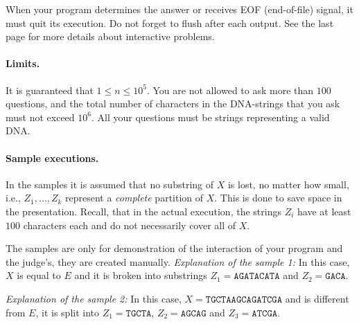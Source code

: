 When your program determines the answer or receives EOF (end-of-file) signal, it must quit its execution.
Do not forget to flush after each output.
See the last page for more details about interactive problems.

\paragraph{Limits.}
It is guaranteed that $1 \leq n \leq 10^5$.
You are not allowed to ask more than $100$ questions, and the total number of characters in the DNA-strings that you ask must not exceed $10^6$.
All your questions must be strings representing a valid DNA.

\paragraph{Sample executions.}
In the samples it is assumed that no substring of $X$ is lost, no matter how small, i.e., $Z_1, \dots, Z_k$ represent a \emph{complete} partition of $X$.
This is done to save space in the presentation.
Recall, that in the actual execution, the strings $Z_i$ have at least $100$ characters each and do not necessarily cover all of $X$.

The samples are only for demonstration of the interaction of your program and the judge's, they are created manually.
{
\renewcommand{\sampleinputname}{Laboratory's feedback}
\renewcommand{\sampleoutputname}{Your questions}
}
\emph{Explanation of the sample 1:}
In this case, $X$ is equal to $E$ and it is broken into substrings $Z_1 = \texttt{AGATACATA}$ and $Z_2 = \texttt{GACA}$.

{
\renewcommand{\sampleinputname}{Laboratory's feedback}
\renewcommand{\sampleoutputname}{Your questions}
}
\emph{Explanation of the sample 2:}
In this case, $X = \texttt{TGCTAAGCAGATCGA}$ and is different from $E$, it is split into $Z_1 = \texttt{TGCTA}$, $Z_2 = \texttt{AGCAG}$ and $Z_3 = \texttt{ATCGA}$.